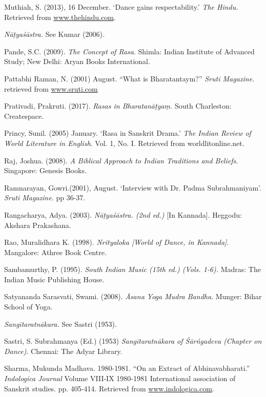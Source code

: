 \begin{thebibliography}{99}
  Muthiah, S. (2013), 16 December. ‘Dance gains respectability.’ \textit{The Hindu.} Retrieved from \url{www.thehindu.com}.

  \textit{Nāṭyaśāstra. }See Kumar (2006)\textit{.}

  Pande, S.C. (2009). \textit{The Concept of Rasa}. Shimla: Indian Institute of Advanced Study; New Delhi: Aryan Books International.

  Pattabhi Raman, N. (2001) August. “What is Bharatantaym?” \textit{Sruti Magazine}. retrieved from \url{www.sruti.com}

  Prativadi, Prakruti. (2017). \textit{Rasas in Bharatanāṭyaṃ. }South Charleston: Createspace.

  Princy, Sunil. (2005) January. ‘Rasa in Sanskrit Drama.’ \textit{The Indian Review of World Literature in English}. Vol. 1, No. I. Retrieved from worldlitonline.net.

  Raj, Joshua. (2008). \textit{A Biblical Approach to Indian Traditions and Beliefs}. Singapore: Genesis Books.

  Ramnarayan, Gowri.(2001), August. ‘Interview with Dr. Padma Subrahmaniyam’. \textit{Sruti Magazine}. pp 36-37.

  Rangacharya, Adya. (2003). \textit{Nāṭyaśāstra. (2nd ed.) }[In Kannada]. Heggodu: Akshara Prakashana.

  Rao, Muralidhara K. (1998). \textit{Nrityaloka [World of Dance, in Kannada]}. Mangalore: Athree Book Centre.

  Sambamurthy, P. (1995). \textit{South Indian Music (15th ed.) (Vols. 1-6). }Madras: The Indian Music Publishing House.

  Satyananda Sarasvati, Swami. (2008). \textit{Āsana Yoga Mudra Bandha}. Munger: Bihar School of Yoga.

  \textit{Sangītaratnākara. }See\textit{ }Sastri (1953).

  Sastri, S. Subrahmanya (Ed.) (1953) \textit{Sangītaratnākara of Śārńgadeva (Chapter on Dance)}. Chennai: The Adyar Library.

  Sharma, Mukunda Madhava. 1980-1981. “On an Extract of Abhinavabharati.” \textit{Indologica Journal} Volume VIII-IX 1980-1981 International association of Sanskrit studies. pp. 405-414. Retrieved from \url{www.indologica.com}.


\end{thebibliography}
